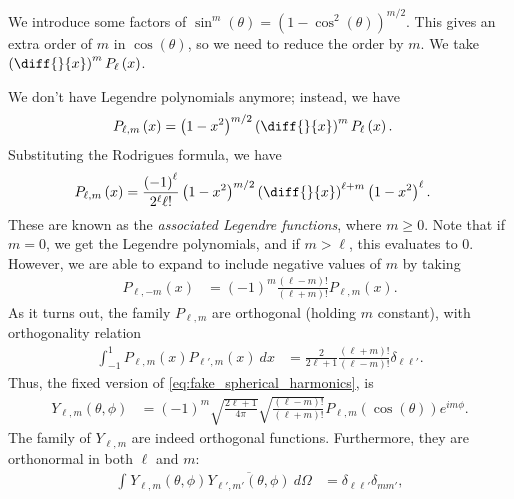 \documentclass[10pt]{mypackage}
\begin{document}
  We introduce some factors of $\sin^{m}\left( \theta \right) = \left( 1-\cos^2\left( \theta \right) \right)^{m/2}$. This gives an extra order of $m$ in $\cos\left( \theta \right)$, so we need to reduce the order by $m$. We take $\left( \diff{}{x} \right)^{m} P_{\ell}\left( x \right)$.\newline

  We don't have Legendre polynomials anymore; instead, we have 
  \begin{align*}
    P_{\ell,m}\left( x \right) &= \left( 1-x^2 \right)^{m/2} \left( \diff{}{x} \right)^{m}P_{\ell}\left( x \right).
  \end{align*}
  Substituting the Rodrigues formula, we have
  \begin{align*}
    P_{\ell,m}\left( x \right) &= \frac{\left( -1 \right)^{\ell}}{2^{\ell}\ell!}\left( 1-x^2 \right)^{m/2}\left( \diff{}{x} \right)^{\ell + m}\left( 1-x^2 \right)^{\ell}.
  \end{align*}
  These are known as the \textit{associated Legendre functions}, where $m \geq 0$. Note that if $m = 0$, we get the Legendre polynomials, and if $m  > \ell$, this evaluates to $0$. However, we are able to expand to include negative values of $m$ by taking
  \begin{align*}
    P_{\ell,-m}\left( x \right) &= \left( -1 \right)^{m} \frac{\left( \ell - m \right)!}{\left( \ell + m \right)!}P_{\ell,m}\left( x \right).
  \end{align*}
  As it turns out, the family $P_{\ell,m}$ are orthogonal (holding $m$ constant), with orthogonality relation
  \begin{align*}
    \int_{-1}^{1} P_{\ell,m}\left( x \right)P_{\ell',m}\left( x \right)\:dx &= \frac{2}{2\ell + 1}\frac{\left( \ell + m \right)!}{\left( \ell -m \right)!}\delta_{\ell \ell'}.
  \end{align*}
  Thus, the fixed version of \eqref{eq:fake_spherical_harmonics}, is
  \begin{align*}
    Y_{\ell,m}\left( \theta,\phi \right) &= \left( -1 \right)^{m}\sqrt{\frac{2\ell + 1}{4\pi}}\sqrt{\frac{\left( \ell - m \right)!}{\left( \ell + m \right)!}}P_{\ell,m}\left( \cos\left( \theta \right) \right)e^{im\phi}.
  \end{align*}
  The family of $Y_{\ell,m}$ are indeed orthogonal functions. Furthermore, they are orthonormal in both $\ell$ and $m$:
  \begin{align*}
    \int_{}^{} Y_{\ell,m}\left( \theta,\phi \right) \overline{Y_{\ell',m'}\left( \theta,\phi \right)}\:d\Omega &= \delta_{\ell \ell'}\delta_{m m'},
  \end{align*}
\end{document}
